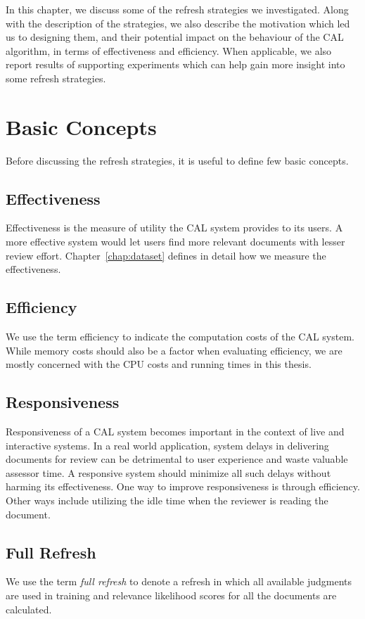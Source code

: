 \label{chap:refresh}
In this chapter, we discuss some of the refresh strategies we investigated.
Along with the description of the strategies, we also describe the motivation
which led us to designing them, and their potential impact on the behaviour of
the CAL algorithm, in terms of effectiveness and efficiency. When applicable, we
also report results of supporting experiments which can help gain more insight
into some refresh strategies.

\section{Basic Concepts}
Before discussing the refresh strategies, it is useful to define few basic
concepts.
\subsection*{Effectiveness}
Effectiveness is the measure of utility the CAL system provides to its users. A
more effective system would let users find more relevant documents with lesser
review effort.  Chapter~\ref{chap:dataset} defines in detail how we measure the
effectiveness.

\subsection*{Efficiency}
We use the term efficiency to indicate the computation costs of the CAL system.
While memory costs should also be a factor when evaluating efficiency, we are
mostly concerned with the CPU costs and running times in this thesis.

\subsection*{Responsiveness}
Responsiveness of a CAL system becomes important in the context of live and
interactive systems. In a real world application, system delays in delivering
documents for review can be detrimental to user experience and waste valuable
assessor time. A responsive system should minimize all such delays without
harming its effectiveness. One way to improve responsiveness is through
efficiency.  Other ways include utilizing the idle time when the reviewer is
reading the document.

\subsection*{Full Refresh}
We use the term \textit{full refresh} to denote a refresh in which all
available judgments are used in training and relevance likelihood scores for all
the documents are calculated.

